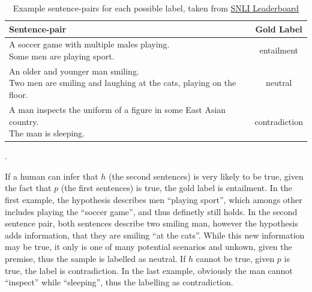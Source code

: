 \begin{table}[tph!]
\centering
\begin{tabular}{lc}
\textbf{Sentence-pair} & \textbf{Gold Label} \\
\toprule
\specialcell{A soccer game with multiple males playing.\\Some men are playing sport.} & entailment \\
\midrule
\specialcell{An older and younger man smiling.\\Two men are smiling and laughing at the cats, playing on the floor.} & neutral \\
\midrule
\specialcell{A man inspects the uniform of a figure in some East Asian country.\\The man is sleeping.} & contradiction\\
\bottomrule
\end{tabular}
\caption{Example sentence-pairs for each possible label, taken from \href{https://nlp.stanford.edu/projects/snli/}{SNLI Leaderboard}}.
\label{tab:label_examples}
\end{table}
If a human can infer that $h$ (the second sentences) is very likely to be true, given the fact that $p$ (the first sentences) is true, the gold label is entailment. In the first example, the hypothesis describes men ``playing sport'', which amongs other includes playing the ``soccer game'', and thus definetly still holds. In the second sentence pair, both sentences describe two smiling man, however the hypothesis adds information, that they are smiling ``at the cats''. While this new information may be true, it only is one of many potential scenarios and unkown, given the premise, thus the sample is labelled as neutral. If $h$ cannot be true, given $p$ is true, the label is contradiction. In the last example, obviously the man cannot ``inspect'' while ``sleeping'', thus the labelling as contradiction.

